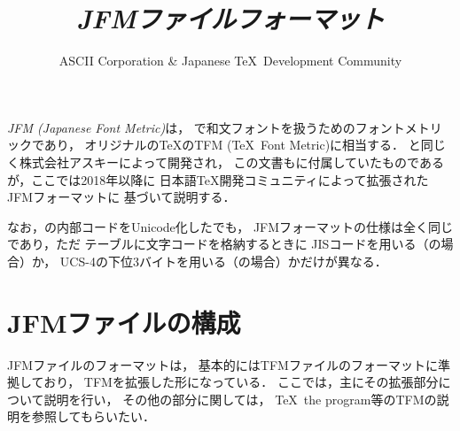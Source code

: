 \documentclass[a4paper,11pt,nomag]{jsarticle}
\title{\emph{JFMファイルフォーマット}}
\author{ASCII Corporation \& Japanese \TeX\ Development Community}
\begin{document}
\maketitle

\emph{JFM (Japanese Font Metric)}は，
\pTeX で和文フォントを扱うためのフォントメトリックであり，
オリジナルの\TeX のTFM (\TeX\ Font Metric)に相当する．
\pTeX と同じく株式会社アスキーによって開発され，
この文書も\pTeX に付属していたものであるが，ここでは2018年以降に
日本語\TeX 開発コミュニティによって拡張されたJFMフォーマットに
基づいて説明する．

なお，\pTeX の内部コードをUnicode化した\upTeX でも，
JFMフォーマットの仕様は全く同じであり，ただ
テーブルに文字コードを格納するときに
JISコードを用いる（\pTeX の場合）か，
UCS-4の下位3バイトを用いる（\upTeX の場合）かだけが異なる．

\tableofcontents
\clearpage

\section{JFMファイルの構成}\label{jfm-format}

JFMファイルのフォーマットは，
基本的にはTFMファイルのフォーマットに準拠しており，
TFMを拡張した形になっている．
ここでは，主にその拡張部分について説明を行い，
その他の部分に関しては，
\TeX\ the program等のTFMの説明を参照してもらいたい．
\end{document}
